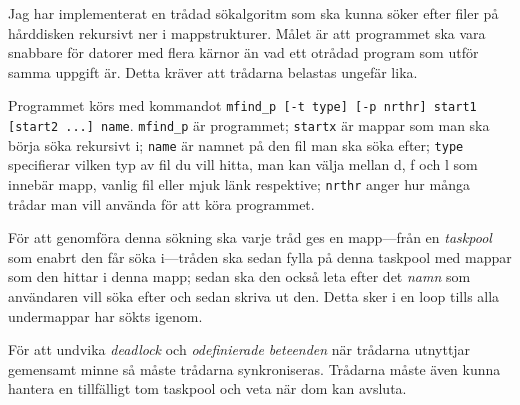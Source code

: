 
Jag har implementerat en trådad sökalgoritm som ska kunna söker efter filer på hårddisken rekursivt ner i
mappstrukturer. Målet är att programmet ska vara snabbare för datorer med flera kärnor än vad ett otrådad
program som utför samma uppgift är. Detta kräver att trådarna belastas ungefär lika.

Programmet körs med kommandot \texttt{mfind\_p [-t type] [-p nrthr] start1 [start2 ...] name}.
\texttt{mfind\_p} är programmet; \texttt{startx} är mappar som man ska börja söka rekursivt i;
\texttt{name} är namnet på den fil man ska söka efter; \texttt{type} specifierar vilken typ av fil du 
vill hitta, man kan välja mellan d, f och l som innebär mapp, vanlig fil eller mjuk länk respektive; \texttt{nrthr} anger hur många trådar man vill använda för att köra programmet.

För att genomföra denna sökning ska varje tråd ges en mapp---från en \emph{taskpool} som enabrt den får söka i---tråden ska sedan fylla på denna taskpool med mappar som den hittar i denna mapp; sedan ska den också leta efter det \emph{namn} som användaren vill söka efter och sedan skriva ut den. Detta sker i en loop tills alla undermappar har sökts igenom.

För att undvika \emph{deadlock} och \emph{odefinierade beteenden} när trådarna utnyttjar gemensamt minne så måste trådarna synkroniseras. Trådarna måste även kunna hantera en tillfälligt tom taskpool och veta när dom kan avsluta.


